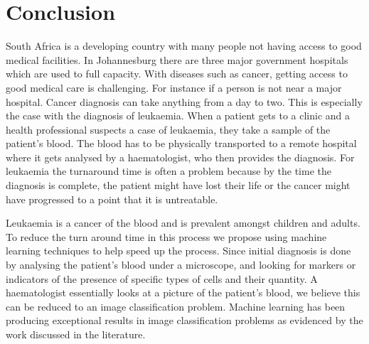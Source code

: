 \documentclass[a4paper,11pt]{article}
\begin{document}
\section{Conclusion}
\label{conclusion}
South Africa is a developing country with many people not having access to good medical facilities. In Johannesburg there are three major government hospitals which are used to full capacity. With diseases such as cancer, getting access to good medical care is challenging. For instance if a person is not near a major hospital. Cancer diagnosis can take anything from a day to two. This is especially the case with the diagnosis of leukaemia. When a patient gets to a clinic and a health professional suspects a case of leukaemia, they take a sample of the patient's blood. The blood has to be physically transported to a remote hospital where it gets analysed by a haematologist, who then provides the diagnosis. For leukaemia the turnaround time is often a problem because by the time the diagnosis is complete, the patient might have lost their life or the cancer might have progressed to a point that it is untreatable. 

Leukaemia is a cancer of the blood and is prevalent amongst children and adults. To reduce the turn around time in this process we propose using machine learning techniques to help speed up the process. Since initial diagnosis is done by analysing the patient's blood under a microscope, and looking for markers or indicators of the presence of specific types of cells and their quantity. A haematologist essentially looks at a picture of the patient's blood, we believe this can be reduced to an image classification problem. Machine learning has been producing exceptional results in image classification problems as evidenced by the work discussed in the literature.
\end{document}
